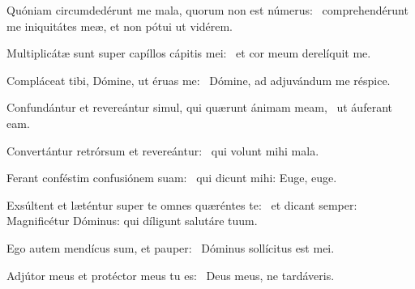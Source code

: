 \item Quóniam circumdedérunt me mala, quorum non est númerus:~\psstar{} comprehendérunt me iniquitátes meæ, et non pótui ut vidérem.

\item Multiplicátæ sunt super capíllos cápitis mei:~\psstar{} et cor meum derelíquit me.

\item Compláceat tibi, Dómine, ut éruas me:~\psstar{} Dómine, ad adjuvándum me réspice.

\item Confundántur et revereántur simul, qui quærunt ánimam meam,~\psstar{} ut áuferant eam.

\item Convertántur retrórsum et revereántur:~\psstar{} qui volunt mihi mala.

\item Ferant conféstim confusiónem suam:~\psstar{} qui dicunt mihi: Euge, euge.

\item Exsúltent et læténtur super te omnes quæréntes te:~\psstar{} et dicant semper: Magnificétur Dóminus: qui díligunt salutáre tuum.

\item Ego autem mendícus sum, et pauper:~\psstar{} Dóminus sollícitus est mei.

\item Adjútor meus et protéctor meus tu es:~\psstar{} Deus meus, ne tardáveris.